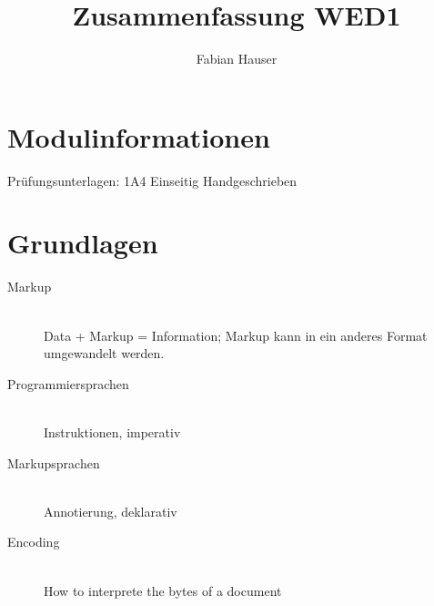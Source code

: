 

\title{Zusammenfassung WED1}
\author{Fabian Hauser}
 

\maketitle
\section{Modulinformationen}
Prüfungsunterlagen: 1A4 Einseitig Handgeschrieben

\section{Grundlagen}

\begin{description}
	
	\item[Markup] \hfill \\
		Data + Markup = Information; Markup kann in ein anderes Format umgewandelt werden.
		
	\item[Programmiersprachen] \hfill \\
		Instruktionen, imperativ
	\item[Markupsprachen] \hfill \\
		Annotierung, deklarativ
	\item[Encoding] \hfill \\
		How to interprete the bytes of a document
\end{description}

